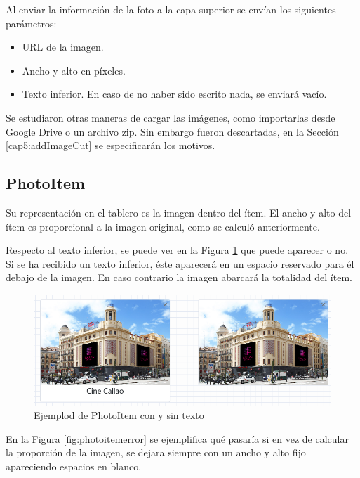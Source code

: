 Al enviar la información de la foto a la capa superior se envían los siguientes parámetros: 

\begin{itemize}
	\item URL de la imagen.
	\item Ancho y alto en píxeles.
	\item Texto inferior. En caso de no haber sido escrito nada, se enviará vacío.
\end{itemize}

Se estudiaron otras maneras de cargar las imágenes, como importarlas desde Google Drive o un archivo zip. Sin embargo fueron descartadas, en la Sección \ref{cap5:addImageCut} se especificarán los motivos. 

\subsection{PhotoItem}

Su representación en el tablero es la imagen dentro del ítem. El ancho y alto del ítem es proporcional a la imagen original, como se calculó anteriormente. 

Respecto al texto inferior, se puede ver en la Figura \ref{fig:photoitemtexto} que puede aparecer o no. Si se ha recibido un texto inferior, éste aparecerá en un espacio reservado para él debajo de la imagen. En caso contrario la imagen abarcará la totalidad del ítem.

\begin{figure}[h!]
	\centering
	\includegraphics[width=0.7\linewidth]{Imagenes/Bitmap/photoItemTexto}
	\caption{Ejemplod de PhotoItem con y sin texto}
	\label{fig:photoitemtexto}
\end{figure}


En la Figura \ref{fig:photoitemerror} se ejemplifica qué pasaría si en vez de calcular la proporción de la imagen, se dejara siempre con un ancho y alto fijo apareciendo espacios en blanco.

